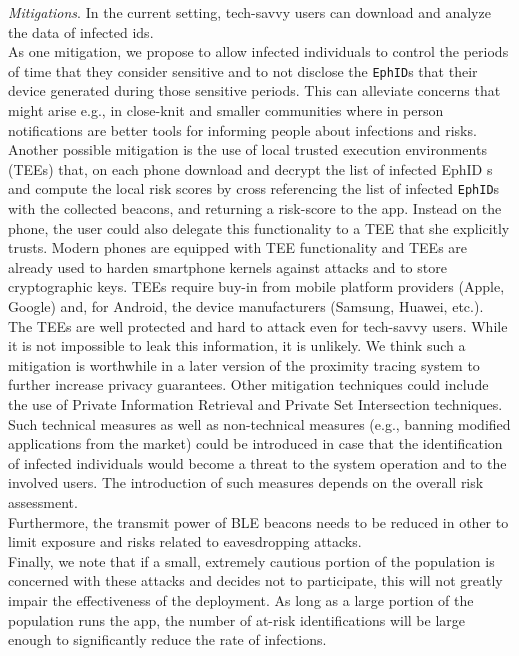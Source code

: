 \documentclass[12pt,a4paper]{article}
\begin{document}
\textit{Mitigations}. In the current setting, tech-savvy users can download and analyze the data of infected ids.\\
As one mitigation, we propose to allow infected individuals to control the periods of time that they consider sensitive and to not disclose the \texttt{EphID}s that their device generated during those sensitive periods. This can alleviate concerns that might arise e.g., in close-knit and  smaller communities where in person notifications are better tools for informing people about infections and risks.\\
Another possible mitigation is the use of local trusted execution environments (TEEs) that, on each phone download and decrypt the list of infected EphID s and compute the local risk scores by cross referencing the list of infected \texttt{EphID}s with the collected beacons, and returning a risk-score to the app. Instead on the phone, the user could also delegate this functionality to a TEE that she explicitly trusts. Modern phones are equipped with TEE functionality and TEEs are already used to harden smartphone kernels against attacks and to store cryptographic keys. TEEs require buy-in from mobile platform providers (Apple, Google) and, for Android, the device manufacturers (Samsung, Huawei, etc.). The TEEs are well protected and hard to attack even for tech-savvy users. While it is not impossible to leak this information, it is unlikely. We think such a mitigation is worthwhile in a later version of the proximity tracing system to further increase privacy guarantees. Other mitigation techniques could include the use of Private Information Retrieval and Private Set Intersection techniques.\\[0.3cm]
Such technical measures as well as non-technical measures (e.g., banning modified
applications from the market) could be introduced in case that the identification of infected individuals would become a threat to the system operation and to the involved users. The introduction of such measures depends on the overall risk assessment.\\[0.3cm]
Furthermore, the transmit power of BLE beacons needs to be reduced in other to limit
exposure and risks related to eavesdropping attacks.\\[0.3cm]
Finally, we note that if a small, extremely cautious portion of the population is concerned with these attacks and decides not to participate, this will not greatly impair the effectiveness of the deployment. As long as a large portion of the population runs the app, the number of at-risk identifications will be large enough to significantly reduce the rate of infections.
\end{document}
